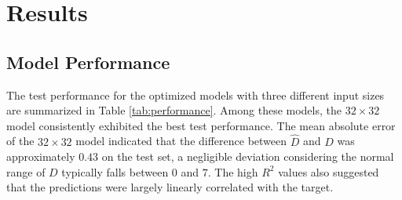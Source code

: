 \documentclass[]{interact}
\theoremstyle{plain}%
\theoremstyle{definition}
\theoremstyle{remark}
\begin{document}
\begin{table}
\centering
\caption{\label{tab:best-hyperparameter}Hyperparameters values for the optimized computer vision models with different input sizes.}
\centering
{}
\end{table}

\section{Results}\label{sec-model-results}

\subsection{Model Performance}\label{model-performance}

The test performance for the optimized models with three different input
sizes are summarized in Table \ref{tab:performance}. Among these models,
the \(32 \times 32\) model consistently exhibited the best test
performance. The mean absolute error of the \(32 \times 32\) model
indicated that the difference between \(\hat{D}\) and \(D\) was
approximately \(0.43\) on the test set, a negligible deviation
considering the normal range of \(D\) typically falls between \(0\) and
\(7\). The high \(R^2\) values also suggested that the predictions were
largely linearly correlated with the target.
\end{document}
